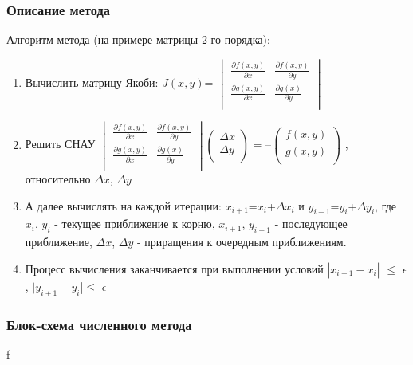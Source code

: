 \subsubsection{Описание метода}
\underline{Алгоритм метода (на примере матрицы 2-го порядка):}
\begin{enumerate}
    \item Вычислить матрицу Якоби: $J(x,y)$=
    $\begin{vmatrix}
        \frac{\partial f(x,y)}{\partial x} & \frac{\partial f(x,y)}{\partial y} \\
        \frac{\partial g(x,y)}{\partial x} & \frac{\partial g(x)}{\partial y} \\
    \end{vmatrix}$
    \item Решить СНАУ $\begin{vmatrix}
        \frac{\partial f(x,y)}{\partial x} & \frac{\partial f(x,y)}{\partial y} \\
        \frac{\partial g(x,y)}{\partial x} & \frac{\partial g(x)}{\partial y} \\
    \end{vmatrix}$$\left( \begin{array}{c}
                       \Delta x \\
                       \Delta y \\
    \end{array}\right)$ = --$\left( \begin{array}{c}
                                          f(x,y) \\
                                          g(x,y) \\
    \end{array}\right)$ , относительно $\Delta x$, $\Delta y$
    \item А далее вычислять на каждой итерации: $x_{i+1}$=$x_i$+$\Delta x_i$ и $y_{i+1}$=$y_i$+$\Delta y_i$, где
    $x_i$, $y_i$ - текущее приближение к корню, $x_{i+1}$, $y_{i+1}$ - последующее приближение, $\Delta x$, $\Delta y$ -
    приращения к очередным приближениям.
    \item Процесс вычисления заканчивается при выполнении условий $|x_{i+1} - x_i|$ $\leq$ $\epsilon$, $|y_{i+1} - y_i$|$\leq$ $\epsilon$
\end{enumerate}

\subsubsection{Блок-схема численного метода}
f

